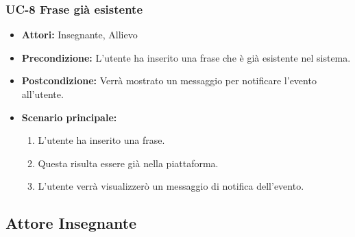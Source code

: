 \subsubsection{UC-8 Frase già esistente}
\begin{itemize}
\item \textbf{Attori: }Insegnante, Allievo

\item \textbf{Precondizione: }L'utente ha inserito una frase che è già esistente nel sistema.
\item \textbf{Postcondizione: }Verrà mostrato un messaggio per notificare l'evento all'utente.
\item \textbf{Scenario principale: }
		\begin{enumerate}
		\item L'utente ha inserito una frase.
		\item Questa risulta essere già nella piattaforma.
		\item L'utente verrà visualizzerò un messaggio di notifica dell'evento.
		\end{enumerate}
\end{itemize}

					
\subsection{Attore Insegnante}
